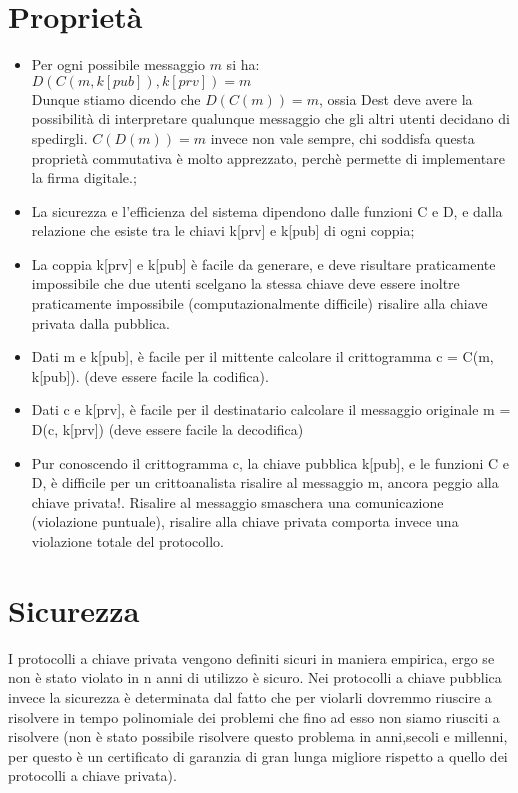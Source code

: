 \newpage

\section{Proprietà}

\begin{itemize}
	\item Per ogni possibile messaggio $m$ si ha:\\
	$D(C(m, k[pub]), k[prv]) = m$ \\
	Dunque stiamo dicendo che $D(C(m)) = m $, ossia Dest deve avere la possibilità di interpretare qualunque messaggio che gli altri utenti decidano di spedirgli. $C(D(m)) = m$ invece non vale sempre, chi soddisfa questa proprietà commutativa è molto apprezzato, perchè permette di implementare la firma digitale.;
	\item La sicurezza e l’efficienza del sistema dipendono dalle
	funzioni C e D, e dalla relazione che esiste tra le chiavi
	k[prv] e k[pub] di ogni coppia;
	\item La coppia k[prv] e k[pub] è facile da generare, e deve
	risultare praticamente impossibile che due utenti scelgano
	la stessa chiave deve essere inoltre praticamente impossibile (computazionalmente difficile) risalire alla chiave privata dalla pubblica.
	\item Dati m e k[pub], è facile per il mittente calcolare il
	crittogramma c = C(m, k[pub]). (deve essere facile la codifica).
	\item Dati c e k[prv], è facile per il destinatario calcolare il
	messaggio originale m = D(c, k[prv]) (deve essere facile la decodifica)
	\item Pur conoscendo il crittogramma c, la chiave pubblica
	k[pub], e le funzioni C e D, è difficile per un
	crittoanalista risalire al messaggio m, ancora peggio alla chiave privata!. Risalire al messaggio smaschera una comunicazione (violazione puntuale), risalire alla chiave privata comporta invece una violazione totale del protocollo.
\end{itemize}

\section{Sicurezza}

I protocolli a chiave privata vengono definiti sicuri in maniera empirica, ergo se non è stato violato in n anni di utilizzo è sicuro. Nei protocolli a chiave pubblica invece la sicurezza è determinata dal fatto che per violarli dovremmo riuscire a risolvere in tempo polinomiale dei problemi che fino ad esso non siamo riusciti a risolvere (non è stato possibile risolvere questo problema in anni,secoli e millenni, per questo è un certificato di garanzia di gran lunga migliore rispetto a quello dei protocolli a chiave privata).

